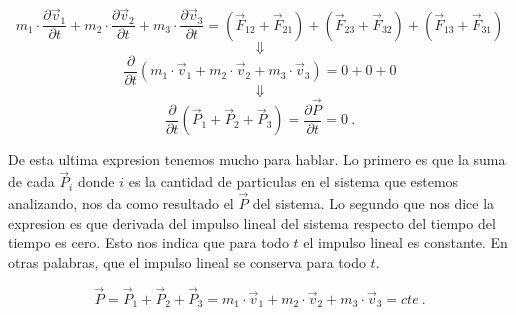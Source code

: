\documentclass[../Main.tex]{subfiles}
\begin{document}
{    \begin{equation*}
        m_1 \cdot \frac{\partial \vec{v} _1}{\partial t} + m_2 \cdot \frac{\partial \vec{v} _2}{\partial t} + m_3 \cdot \frac{\partial \vec{v} _3}{\partial t} = (\vec{F} _{12} + \vec{F} _{21}) + (\vec{F} _{23} + \vec{F} _{32}) + (\vec{F} _{13} + \vec{F} _{31})
    \end{equation*}
    \begin{equation*}
        \Downarrow
    \end{equation*}
    \begin{equation*}
        \frac{\partial}{\partial t} \left(m_1 \cdot \vec{v} _1 + m_2 \cdot \vec{v} _2 + m_3 \cdot \vec{v} _3 \right) =  0 + 0 + 0
    \end{equation*}
    \begin{equation*}
        \Downarrow
    \end{equation*}
    \begin{equation}
        \frac{\partial}{\partial t} \left(\vec{P} _1 + \vec{P} _2 + \vec{P} _3 \right) = \frac{\partial \vec{P}}{\partial t} = 0 \ .
    \end{equation}

    De esta ultima expresion tenemos mucho para hablar. Lo primero es que la suma
    de cada $\vec{P} _i$ donde $i$ es la cantidad de particulas en el sistema que
    estemos analizando, nos da como resultado el $\vec{P}$ del sistema. Lo segundo
    que nos dice la expresion es que derivada del impulso lineal del sistema
    respecto del tiempo del tiempo es cero. Esto nos indica que para todo $t$ el 
    impulso lineal es constante. En otras palabras, que el impulso lineal se
    conserva para todo $t$.

    \begin{equation}
        \vec{P} = \vec{P} _1 + \vec{P} _2 + \vec{P} _3 = m_1 \cdot \vec{v} _1 + m_2 \cdot \vec{v} _2 + m_3 \cdot \vec{v} _3 = cte \ .
        \label{eq:sistP}
    \end{equation}
}
\end{document}
